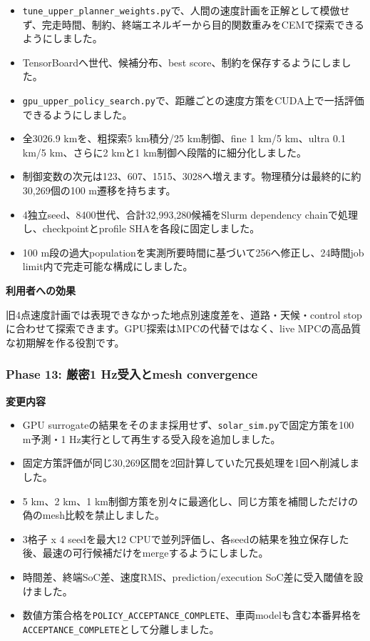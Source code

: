\documentclass[
  japanese,
  a4paper,
  11pt]{article}
\providecommand{\tightlist}{%
  \setlength{\itemsep}{0pt}\setlength{\parskip}{0pt}}
\begin{document}
\begin{itemize}
\tightlist
\item
  \texttt{tune\_upper\_planner\_weights.py}で、人間の速度計画を正解として模倣せず、完走時間、制約、終端エネルギーから目的関数重みをCEMで探索できるようにしました。
\item
  TensorBoardへ世代、候補分布、best
  score、制約を保存するようにしました。
\item
  \texttt{gpu\_upper\_policy\_search.py}で、距離ごとの速度方策をCUDA上で一括評価できるようにしました。
\item
  全3026.9 kmを、粗探索5 km積分/25 km制御、fine 1 km/5 km、ultra 0.1
  km/5 km、さらに2 kmと1 km制御へ段階的に細分化しました。
\item
  制御変数の次元は123、607、1515、3028へ増えます。物理積分は最終的に約30,269個の100
  m遷移を持ちます。
\item
  4独立seed、8400世代、合計32,993,280候補をSlurm dependency
  chainで処理し、checkpointとprofile SHAを各段に固定しました。
\item
  100 m段の過大populationを実測所要時間に基づいて256へ修正し、24時間job
  limit内で完走可能な構成にしました。
\end{itemize}

\textbf{利用者への効果}

旧4点速度計画では表現できなかった地点別速度差を、道路・天候・control
stopに合わせて探索できます。GPU探索はMPCの代替ではなく、live
MPCの高品質な初期解を作る役割です。

\subsubsection{Phase 13: 厳密1 Hz受入とmesh
convergence}\label{phase-13-ux53b3ux5bc61-hzux53d7ux5165ux3068mesh-convergence}

\textbf{変更内容}

\begin{itemize}
\tightlist
\item
  GPU
  surrogateの結果をそのまま採用せず、\texttt{solar\_sim.py}で固定方策を100
  m予測・1 Hz実行として再生する受入段を追加しました。
\item
  固定方策評価が同じ30,269区間を2回計算していた冗長処理を1回へ削減しました。
\item
  5 km、2 km、1
  km制御方策を別々に最適化し、同じ方策を補間しただけの偽のmesh比較を禁止しました。
\item
  3格子 x 4 seedを最大12
  CPUで並列評価し、各seedの結果を独立保存した後、最速の可行候補だけをmergeするようにしました。
\item
  時間差、終端SoC差、速度RMS、prediction/execution
  SoC差に受入閾値を設けました。
\item
  数値方策合格を\texttt{POLICY\_ACCEPTANCE\_COMPLETE}、車両modelも含む本番昇格を\texttt{ACCEPTANCE\_COMPLETE}として分離しました。
\end{itemize}
\end{document}
